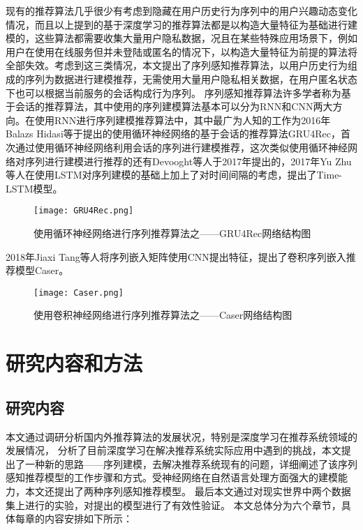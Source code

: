 现有的推荐算法几乎很少有考虑到隐藏在用户历史行为序列中的用户兴趣动态变化情况，而且以上提到的基于深度学习的推荐算法都是以构造大量特征为基础进行建模的，这些算法都需要收集大量用户隐私数据，况且在某些特殊应用场景下，例如用户在使用在线服务但并未登陆或匿名的情况下，以构造大量特征为前提的算法将全部失效。考虑到这三类情况，本文提出了序列感知推荐算法，以用户历史行为组成的序列为数据进行建模推荐，无需使用大量用户隐私相关数据，在用户匿名状态下也可以根据当前服务的会话构成行为序列。
序列感知推荐算法许多学者称为基于会话的推荐算法，其中使用的序列建模算法基本可以分为RNN和CNN两大方向。在使用RNN进行序列建模推荐算法中，其中最广为人知的工作为2016年Balazs Hidasi等于提出的使用循环神经网络的基于会话的推荐算法GRU4Rec，首次通过使用循环神经网络利用会话的序列进行建模推荐，这次类似使用循环神经网络对序列进行建模进行推荐的还有Devooght等人于2017年提出的，2017年Yu Zhu等人在使用LSTM对序列建模的基础上加上了对时间间隔的考虑，提出了Time-LSTM模型。
\begin{figure}[htb]
  \centering
  \texttt{[image: GRU4Rec.png]}\\
  \caption{使用循环神经网络进行序列推荐算法之——GRU4Rec网络结构图}
  \label{fig:GRU4Rec}
\end{figure}

2018年Jiaxi Tang等人将序列嵌入矩阵使用CNN提出特征，提出了卷积序列嵌入推荐模型Caser。
\begin{figure}[htb]
  \centering
  \texttt{[image: Caser.png]}\\
  \caption{使用卷积神经网络进行序列推荐算法之——Caser网络结构图}
  \label{fig:Caser}
\end{figure}

\section{研究内容和方法}
\subsection{研究内容}
本文通过调研分析国内外推荐算法的发展状况，特别是深度学习在推荐系统领域的发展情况，
分析了目前深度学习在解决推荐系统实际应用中遇到的挑战，本文提出了一种新的思路——序列建模，去解决推荐系统现有的问题，详细阐述了该序列感知推荐模型的工作步骤和方式。受神经网络在自然语言处理方面强大的建模能力，本文还提出了两种序列感知推荐模型。
最后本文通过对现实世界中两个数据集上进行的实验，对提出的模型进行了有效性验证。
本文总体分为六个章节，具体每章的内容安排如下所示：

